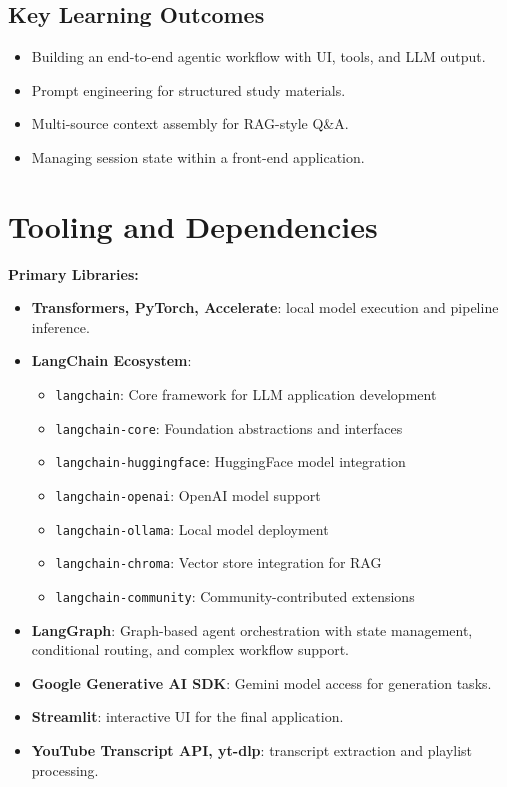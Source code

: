 \documentclass[11pt]{article}
\begin{document}
\subsection{Key Learning Outcomes}
\begin{itemize}[leftmargin=2em]
    \item Building an end-to-end agentic workflow with UI, tools, and LLM output.
    \item Prompt engineering for structured study materials.
    \item Multi-source context assembly for RAG-style Q\&A.
    \item Managing session state within a front-end application.
\end{itemize}

\section{Tooling and Dependencies}
\textbf{Primary Libraries:}
\begin{itemize}[leftmargin=2em]
    \item \textbf{Transformers, PyTorch, Accelerate}: local model execution and pipeline inference.
    \item \textbf{LangChain Ecosystem}:
    \begin{itemize}
        \item \texttt{langchain}: Core framework for LLM application development
        \item \texttt{langchain-core}: Foundation abstractions and interfaces
        \item \texttt{langchain-huggingface}: HuggingFace model integration
        \item \texttt{langchain-openai}: OpenAI model support
        \item \texttt{langchain-ollama}: Local model deployment
        \item \texttt{langchain-chroma}: Vector store integration for RAG
        \item \texttt{langchain-community}: Community-contributed extensions
    \end{itemize}
    \item \textbf{LangGraph}: Graph-based agent orchestration with state management, conditional routing, and complex workflow support.
    \item \textbf{Google Generative AI SDK}: Gemini model access for generation tasks.
    \item \textbf{Streamlit}: interactive UI for the final application.
    \item \textbf{YouTube Transcript API, yt-dlp}: transcript extraction and playlist processing.
\end{itemize}
\end{document}
